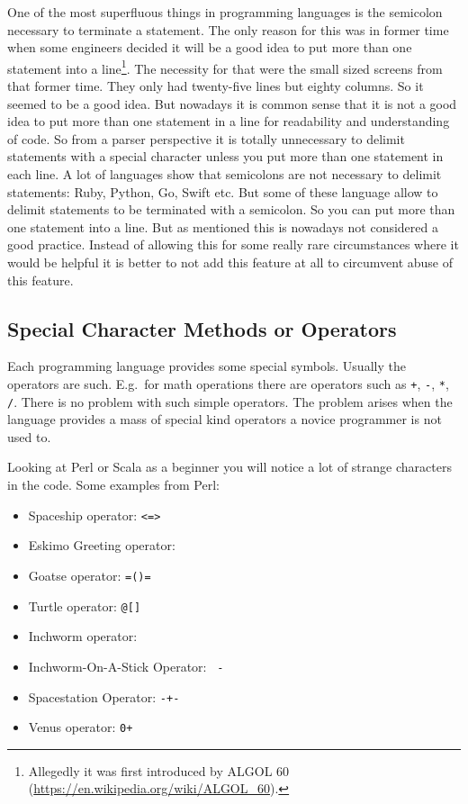 \documentclass[11pt, a4paper]{report}
\begin{document}
One of the most superfluous things in programming languages is the semicolon necessary to terminate a statement. The only reason for this was in former time when some engineers decided it will be a good idea to put more than one statement into a line\footnote{Allegedly it was first introduced by ALGOL 60 (\url{https://en.wikipedia.org/wiki/ALGOL_60}).}. The necessity for that were the small sized screens from that former time. They only had twenty-five lines but eighty columns. So it seemed to be a good idea. But nowadays it is common sense that it is not a good idea to put more than one statement in a line for readability and understanding of code. So from a parser perspective it is totally unnecessary to delimit statements with a special character unless you put more than one statement in each line. A lot of languages show that semicolons are not necessary to delimit statements: Ruby, Python, Go, Swift etc. But some of these language allow to delimit statements to be terminated with a semicolon. So you can put more than one statement into a line. But as mentioned this is nowadays not considered a good practice. Instead of allowing this for some really rare circumstances where it would be helpful it is better to not add this feature at all to circumvent abuse of this feature.

\subsection{Special Character Methods or Operators}

Each programming language provides some special symbols. Usually the operators are such. E.g.\ for math operations there are operators such as \texttt{+}, \texttt{-}, \texttt{*}, \texttt{/}. There is no problem with such simple operators. The problem arises when the language provides a mass of special kind operators a novice programmer is not used to.

Looking at Perl or Scala as a beginner you will notice a lot of strange characters in the code. Some examples from Perl\cite{secret-perl-operators}:

\begin{itemize}
    \item Spaceship operator: \texttt{<=>}
    \item Eskimo Greeting operator: \texttt{}{}
    \item Goatse operator: \texttt{=()=}
    \item Turtle operator: \texttt{@{[]}}
    \item Inchworm operator: \texttt{~~}
    \item Inchworm-On-A-Stick Operator: \texttt{~-}
    \item Spacestation Operator: \texttt{-+-}
    \item Venus operator: \texttt{0+}
\end{itemize}
\end{document}
